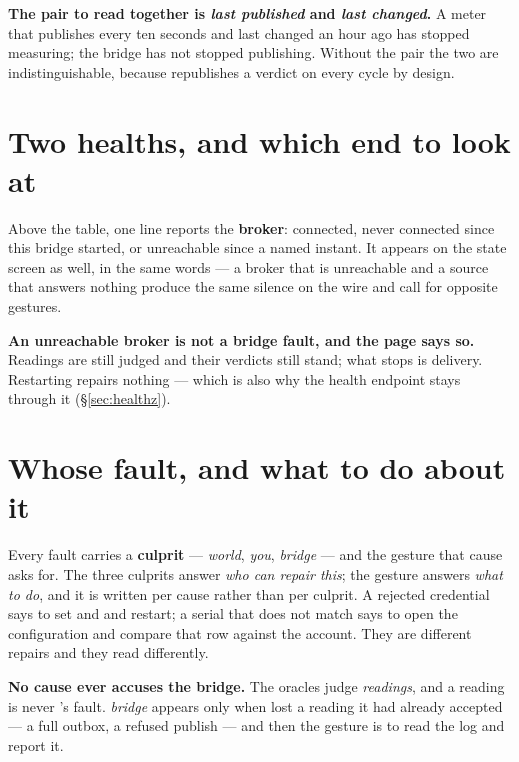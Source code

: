 \begin{note}
\textbf{The pair to read together is \emph{last published} and \emph{last changed}.} A meter
that publishes every ten seconds and last changed an hour ago has stopped measuring; the
bridge has not stopped publishing. Without the pair the two are indistinguishable, because
\prog republishes a verdict on every cycle by design.
\end{note}

\section{Two healths, and which end to look at}

Above the table, one line reports the \textbf{broker}: connected, never connected since this
bridge started, or unreachable since a named instant. It appears on the state screen as well,
in the same words --- a broker that is unreachable and a source that answers nothing produce
the same silence on the wire and call for opposite gestures.

\begin{note}
\textbf{An unreachable broker is not a bridge fault, and the page says so.} Readings are still
judged and their verdicts still stand; what stops is delivery. Restarting \prog repairs nothing
--- which is also why the health endpoint stays  through it (\S\ref{sec:healthz}).
\end{note}

\section{Whose fault, and what to do about it}

Every fault carries a \textbf{culprit} --- \emph{world}, \emph{you}, \emph{bridge} --- and
the gesture that cause asks for. The three culprits answer \emph{who can repair this}; the
gesture answers \emph{what to do}, and it is written per cause rather than per culprit. A
rejected credential says to set  and
 and restart; a serial that does not match says to open the
configuration and compare that row against the account. They are different repairs and they
read differently.

\begin{note}
\textbf{No cause ever accuses the bridge.} The oracles judge \emph{readings}, and a reading is
never \prog's fault. \emph{bridge} appears only when \prog lost a reading it had already
accepted --- a full outbox, a refused publish --- and then the gesture is to read the log and
report it.
\end{note}

